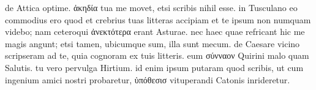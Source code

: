 


 de Attica optime. ἀκηδία tua me movet, etsi scribis nihil esse. in Tusculano eo commodius ero quod et crebrius tuas litteras accipiam et te ipsum non numquam videbo; nam ceteroqui ἀνεκτότερα erant Asturae. nec haec quae refricant hic me magis angunt; etsi tamen, ubicumque sum, illa sunt mecum. de Caesare vicino scripseram ad te, quia cognoram ex tuis litteris. eum σύνναον Quirini malo quam Salutis. tu vero pervulga Hirtium. id enim ipsum putaram quod scribis, ut cum ingenium amici nostri probaretur, ὑπόθεσισ vituperandi Catonis inrideretur.
